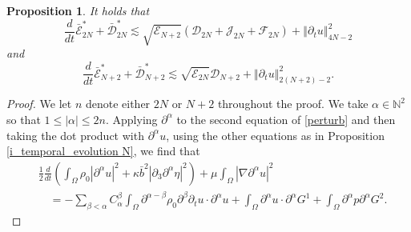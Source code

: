 \documentclass[a4paper,reqno,11pt]{amsart}
\numberwithin{equation}{section}
\providecommand{\abs}[1]{\left\vert#1\right\vert}
\providecommand{\norm}[1]{\left\Vert#1\right\Vert}
\providecommand{\sd}[1]{\mathcal{D}_{#1}}
\providecommand{\se}[1]{\mathcal{E}_{#1}}
\providecommand{\norm}[1]{\left\Vert#1\right\Vert}
\newtheorem{prop}[lem]{Proposition}
\begin{document}
\begin{prop}\label{p_upper_evolution  N12}
It holds that
\begin{equation}\label{p_u_e_00}
\frac{d}{dt}\bar{\mathcal{E}}^{\ast}_{2N}+\bar{\mathcal{D}}_{2N}^{\ast}{\lesssim}\sqrt{ \se{N+2}  } ( \sd{2N}+\mathcal{J}_{2N} +{\mathcal{F}_{2N}})+\norm{{\partial_t} u}_{4N-2}^2
\end{equation}
and
\begin{equation}\label{p_u_e_00''}
\frac{d}{dt}\bar{\mathcal{E}}^\ast_{N+2}+\bar{\mathcal{D}}_{N+2}^\ast{\lesssim}\sqrt{ \se{2N}   } \sd{N+2}+\norm{{\partial_t} u}_{2(N+2)-2}^2  .
\end{equation}
\end{prop}
\begin{proof}
We let $n$ denote either $2N$ or $N+2$ throughout the proof. We take $\alpha\in \mathbb{N}^{2}$ so that $1\le |{\alpha}|\le 2n$. Applying ${\partial}^{\alpha} $ to the second equation of \eqref{perturb} and then taking the dot product with ${\partial}^{\alpha} u$, using the other equations as in Proposition \ref{i_temporal_evolution  N}, we find that
\begin{equation} \label{p_u_e_1110}
\begin{split}
 &{\frac{1}{2}} \frac{d}{dt}\left(  \int_\Omega \rho_0 \abs{{\partial}^{\alpha}   u }^2  +\kappa\bar b^2 \abs{{\partial}_3{\partial}^{\alpha}   \eta }^2\right)+  \mu\int_\Omega  \abs{\nabla {\partial}^{\alpha} u }^2
 \\&\quad=-\sum_{\beta<\alpha}C_\alpha^\beta\int_\Omega {\partial}^{{\alpha}-\beta} \rho_0 {\partial}^{\beta}\partial_t  u \cdot{\partial}^{\alpha}   u+ \int_\Omega   {\partial}^{\alpha}  u  \cdot  {\partial}^{\alpha}  G^1 +\int_\Omega   {\partial}^{\alpha}  p  {\partial}^{\alpha}  G^2.
\end{split}
\end{equation}


\end{proof}
\end{document}
